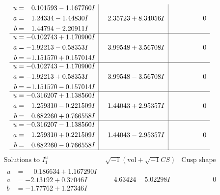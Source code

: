 \documentclass[1p]{elsarticle_modified}
\theoremstyle{definition}
\newcommand{\I}{\sqrt{-1}}
\begin{document}
$$\begin{array}{c|c|c}
\begin{aligned}
u &= \phantom{-}0.101593 - 1.167760 I \\
a &= \phantom{-}1.24334 - 1.44830 I \\
b &= \phantom{-}1.44794 - 2.20911 I\end{aligned}
 & \phantom{-}2.35723 + 8.34056 I & \phantom{-0.000000 } 0 \\ \hline\begin{aligned}
u &= -0.102743 + 1.170900 I \\
a &= -1.92213 - 0.58353 I \\
b &= -1.151570 + 0.157014 I\end{aligned}
 & \phantom{-}3.99548 + 3.56708 I & \phantom{-0.000000 } 0 \\ \hline\begin{aligned}
u &= -0.102743 - 1.170900 I \\
a &= -1.92213 + 0.58353 I \\
b &= -1.151570 - 0.157014 I\end{aligned}
 & \phantom{-}3.99548 - 3.56708 I & \phantom{-0.000000 } 0 \\ \hline\begin{aligned}
u &= -0.316207 + 1.138560 I \\
a &= \phantom{-}1.259310 - 0.221509 I \\
b &= \phantom{-}0.882260 + 0.766558 I\end{aligned}
 & \phantom{-}1.44043 + 2.95357 I & \phantom{-0.000000 } 0 \\ \hline\begin{aligned}
u &= -0.316207 - 1.138560 I \\
a &= \phantom{-}1.259310 + 0.221509 I \\
b &= \phantom{-}0.882260 - 0.766558 I\end{aligned}
 & \phantom{-}1.44043 - 2.95357 I & \phantom{-0.000000 } 0\\
 \hline 
 \end{array}$$\newpage$$\begin{array}{c|c|c}  
\text{Solutions to }I^u_{1}& \I (\text{vol} + \sqrt{-1}CS) & \text{Cusp shape}\\
 \hline 
\begin{aligned}
u &= \phantom{-}0.186634 + 1.167290 I \\
a &= -2.13192 + 0.37046 I \\
b &= -1.77762 + 1.27346 I\end{aligned}
 & \phantom{-}4.63424 - 5.02298 I & \phantom{-0.000000 } 0 \\ \hline\begin{aligned}

\end{aligned}
\end{array}$$
\end{document}
